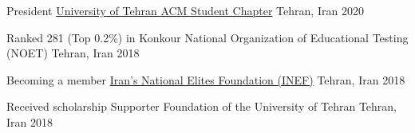 



\begin{cvhonors}

  \cvhonor
    {President} %
    {\href{https://www.linkedin.com/company/ut_acm/about/}{University of Tehran ACM Student Chapter}} %
    {Tehran, Iran} %
    {2020} %

  \cvhonor
    {Ranked 281 (Top 0.2\%) in Konkour} %
    {National Organization of Educational Testing (NOET)} %
    {Tehran, Iran} %
    {2018} %

  \cvhonor
    {Becoming a member} %
    {\href{https://en.bmn.ir}{Iran's National Elites Foundation (INEF)}} %
    {Tehran, Iran} %
    {2018} %

  \cvhonor
    {Received scholarship} %
    {Supporter Foundation of the University of Tehran} %
    {Tehran, Iran} %
    {2018} %

\end{cvhonors}




